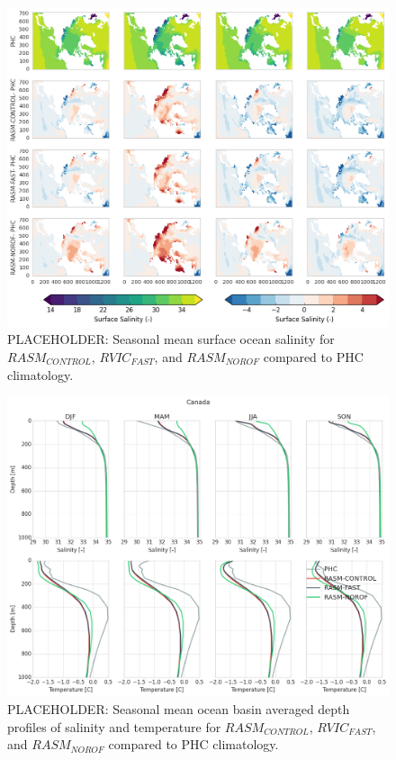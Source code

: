 \documentclass[jgrga, draft]{agutex}
\begin{document}
\clearpage
\begin{figure}
\noindent\includegraphics[width=40pc,natwidth=1]{Figure_7}
\caption{PLACEHOLDER: Seasonal mean surface ocean salinity for $RASM_{CONTROL}$, $RVIC_{FAST}$, and $RASM_{NOROF}$ compared to PHC climatology.}
\label{fig:7}
\end{figure}

\clearpage
\begin{figure}
\noindent\includegraphics[width=40pc,natwidth=1]{Figure_8}
\caption{PLACEHOLDER: Seasonal mean ocean basin averaged depth profiles of salinity and temperature for $RASM_{CONTROL}$, $RVIC_{FAST}$, and $RASM_{NOROF}$ compared to PHC climatology.}
\label{fig:8}
\end{figure}
\end{document}
